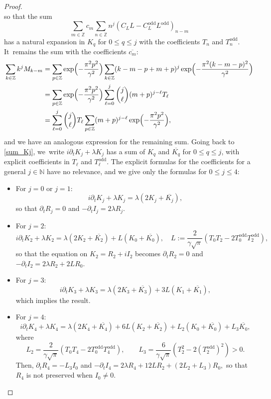 \documentclass[JEP,XML,SOM,Unicode,NoFloatCountersInSection,published]{cedram}
\theoremstyle{definition}
\let\EE\exp
\let\ov\overline
\newcommand\Z{\mathbb Z}
\newcommand\N{\mathbb N}
\newcommand{\pa}[1]{\left(#1\right)}
\begin{document}
\begin{proof}
\begin{equation*}
\end{equation*}
so that the sum\vspace*{-3pt}
\[
\sum_{m\in\Z}c_m\sum_{n\in\Z} n^j {(C_LL-C_L^{\text{odd}}L^{\text{odd}})}_{n-m} 
\]
has a natural expansion in $K_q$ for $0 \leq q \leq j$ with the coefficients $T_n$ and $T_n^\text{odd}$. It~remains the sum with the coefficients $\ov{c_m}$:\vspace*{-3pt}
\begin{align*}
\sum_{k\in\Z} k^j M_{k-m}
& =\sum_{p\in\Z}\EE\Bigl({-\frac{\pi^2p^2}{\gamma^2}}\Bigr) \sum_{k\in\Z}(k-m-p+m+p)^j \EE\Bigl({-\frac{\pi^2(k-m-p)^2}{\gamma^2}}\Bigr) \\
&=\sum_{p\in\Z}\EE\Bigl({-\frac{\pi^2p^2}{\gamma^2}}\Bigr) \sum_{\ell=0}^j\dbinom{j}{\ell}(m+p)^{j-\ell}T_\ell\\
& = \sum_{\ell=0}^j\dbinom{j}{\ell}T_\ell \sum_{p \in \Z}(m+p)^{j-\ell}\EE\Bigl({-\frac{\pi^2p^2}{\gamma^2}}\Bigr),
\end{align*}
and we have an analogous expression for the remaining sum. Going back to \eqref{sum_Kj}, we~write $i\partial_t K_j + \lambda K_j$ has a sum of $K_q$ and $\ov{K_{q}}$ for $0 \leq q \leq j$, with explicit coefficients in $T_\ell$ and $T_\ell^\text{odd}$. The explicit formulas for the coefficients for a general $j \in \N$ have no relevance, and we give only the formulas for $0 \leq j \leq 4$:
\begin{itemize}
\item
For $j=0$ or $j=1$:\vspace*{-3pt}
\[
i \partial_t K_j +\lambda K_j= \lambda (2K_j + \ov{K_j}),
\]
so that $\partial_tR_j = 0$ and $-\partial_t I_j = 2\lambda R_j$.

\item
For $j=2$:\vspace*{-3pt}
\[
i \partial_t K_2 + \lambda K_2 = \lambda (2K_2 + \ov{K_2}) + L(K_0 + \ov{K_0}), \quad L:= \frac{2}{\gamma\sqrt{\pi}}(T_0T_2-2T_0^{\text{odd}}T_2^{\text{odd}}),
\]
so that the equation on $K_2=R_2+iI_2$ becomes $\partial_tR_2 =0$ and $-\partial_tI_2 = 2\lambda R_2 + 2LR_0$.

\item
For $j=3$:\vspace*{-3pt}
\[
i\partial_tK_3 + \lambda K_3= \lambda (2K_3 + \ov{K_3}) + 3L(K_1 + \ov{K_1}), 
\]
which implies the result.

\item
For $j=4$:\vspace*{-3pt}
\[
i\partial_tK_4 + \lambda K_4= \lambda (2K_4 + \ov{K_4}) + 6L(K_2 + \ov{K_2}) + L_2(K_0 + \ov{K_0}) + L_3 \ov{K_0},
\]
where\vspace*{-3pt}
\[
L_2 = \frac{2}{\gamma\sqrt{\pi}}\pa{T_0 T_4-2T_0^{\text{odd}}T_4^{\text{odd}}}, \qquad L_3 = \frac{6}{\gamma\sqrt{\pi}}\pa{T_2^2-2(T_2^{\text{odd}})^2} > 0.
\]
Then, $\partial_tR_4 = - L_3I_0 $ and $-\partial_tI_4 = 2\lambda R_4 +12L R_2 +(2L_2+L_3)R_0, $ so that $R_4$ is not preserved when $I_0 \neq 0$.\qedhere
\end{itemize}
\end{proof}

\backmatter
\nocite{CRY,BBCE}


\end{document}
